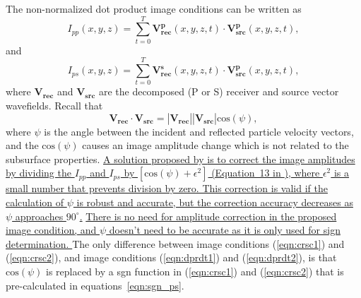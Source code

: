 \documentclass[manuscript,ulem,graphix,revised]{geophysics}
\begin{document}
The non-normalized dot product image conditions can be written as
\begin{equation}
I_{pp}(x,y,z)=\sum_{t=0}^{T}\mathbf{V^p_{rec}}(x,y,z,t)\cdot \mathbf{V^p_{src}}(x,y,z,t),
\label{eqn:dprdt1}
\end{equation}
and
\begin{equation}
I_{ps}(x,y,z)=\sum_{t=0}^{T}\mathbf{V^s_{rec}}(x,y,z,t)\cdot \mathbf{V^p_{src}}(x,y,z,t),
\label{eqn:dprdt2}
\end{equation}
where $\mathbf{V_{rec}}$ and $\mathbf{V_{src}}$ are the decomposed (P or S) receiver and source vector wavefields. Recall that 
\begin{equation}
\mathbf{V_{rec}}\cdot \mathbf{V_{src}}=|\mathbf{V_{rec}}||\mathbf{V_{src}}|\mathrm{cos}(\psi),
\label{eqn:a3}
\end{equation}
where $\psi$ is the angle between the incident and reflected particle velocity vectors, and the $\mathrm{cos}(\psi)$ causes an image amplitude change which is not related to the subsurface properties. 
\marginpar{[4]}\uline{A solution proposed by \mbox{\citet{du17}} is to correct the image amplitudes by dividing the $I_{pp}$ and $I_{ps}$ by $[\mathrm{cos}(\psi) + \epsilon^2]$ (Equation~13 in \mbox{\citet{du17}}), where $\epsilon^2$ is a small number that prevents division by zero. This correction is valid if the calculation of $\psi$ is robust and accurate, but the correction accuracy decreases as $\psi$ approaches $90^\circ$.}
\marginpar{[1,4,5]}\uline{There is no need for amplitude correction in the proposed image condition, and $\psi$ doesn't need to be accurate as it is only used for sign determination. }
The only difference between image conditions (\ref{eqn:crsc1}) and (\ref{eqn:crsc2}), and image conditions (\ref{eqn:dprdt1}) and (\ref{eqn:dprdt2}), is that $\mathrm{cos}(\psi)$ is replaced by a sgn function in (\ref{eqn:crsc1}) and (\ref{eqn:crsc2}) that is pre-calculated in equations~\ref{eqn:sgn_ps}.


\newpage


\end{document}
